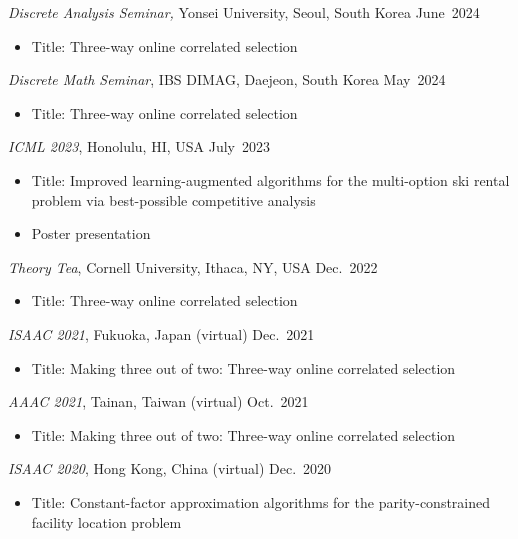 \documentclass{article}
\newcommand{\killinitspace}{-0.7em}
\begin{document}
\textsl{Discrete Analysis Seminar,} Yonsei University, Seoul, South Korea \hfill June~2024
\vspace{\killinitspace}
\begin{itemize}
\item Title: Three-way online correlated selection
\end{itemize}

\textsl{Discrete Math Seminar}, IBS DIMAG, Daejeon, South Korea \hfill May~2024
\vspace{\killinitspace}
\begin{itemize}
\item Title: Three-way online correlated selection
\end{itemize}

\textsl{ICML 2023}, Honolulu, HI, USA \hfill July~2023
\vspace{\killinitspace}
\begin{itemize}
\item Title: Improved learning-augmented algorithms for the multi-option ski rental problem via best-possible competitive analysis
\item Poster presentation
\end{itemize}

\textsl{Theory Tea}, Cornell University, Ithaca, NY, USA \hfill Dec.~2022
\vspace{\killinitspace}
\begin{itemize}
\item Title: Three-way online correlated selection
\end{itemize}

\textsl{ISAAC 2021}, Fukuoka, Japan (virtual) \hfill Dec.~2021
\vspace{\killinitspace}
\begin{itemize}
\item Title: Making three out of two: Three-way online correlated selection
\end{itemize}

\textsl{AAAC 2021}, Tainan, Taiwan (virtual) \hfill Oct.~2021
\vspace{\killinitspace}
\begin{itemize}
\item Title: Making three out of two: Three-way online correlated selection
\end{itemize}

\textsl{ISAAC 2020}, Hong Kong, China (virtual) \hfill Dec.~2020
\vspace{\killinitspace}
\begin{itemize}
\item Title: Constant-factor approximation algorithms for the parity-constrained facility location problem
\end{itemize}
\end{document}
